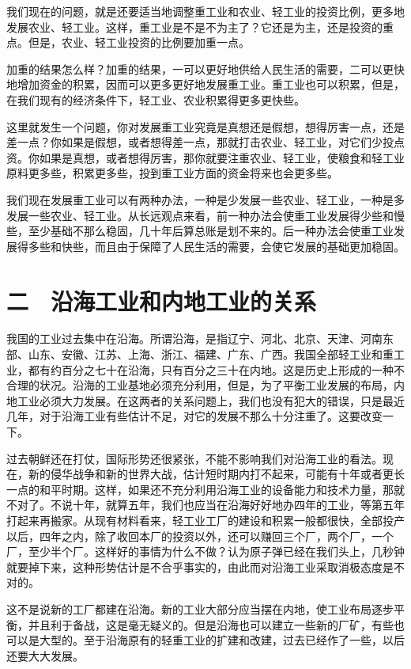 我们现在的问题，就是还要适当地调整重工业和农业、轻工业的投资比例，更多地发展农业、轻工业。这样，重工业是不是不为主了？它还是为主，还是投资的重点。但是，农业、轻工业投资的比例要加重一点。

加重的结果怎么样？加重的结果，一可以更好地供给人民生活的需要，二可以更快地增加资金的积累，因而可以更多更好地发展重工业。重工业也可以积累，但是，在我们现有的经济条件下，轻工业、农业积累得更多更快些。

这里就发生一个问题，你对发展重工业究竟是真想还是假想，想得厉害一点，还是差一点？你如果是假想，或者想得差一点，那就打击农业、轻工业，对它们少投点资。你如果是真想，或者想得厉害，那你就要注重农业、轻工业，使粮食和轻工业原料更多些，积累更多些，投到重工业方面的资金将来也会更多些。

我们现在发展重工业可以有两种办法，一种是少发展一些农业、轻工业，一种是多发展一些农业、轻工业。从长远观点来看，前一种办法会使重工业发展得少些和慢些，至少基础不那么稳固，几十年后算总账是划不来的。后一种办法会使重工业发展得多些和快些，而且由于保障了人民生活的需要，会使它发展的基础更加稳固。

\section{二　沿海工业和内地工业的关系}

我国的工业过去集中在沿海。所谓沿海，是指辽宁、河北、北京、天津、河南东部、山东、安徽、江苏、上海、浙江、福建、广东、广西。我国全部轻工业和重工业，都有约百分之七十在沿海，只有百分之三十在内地。这是历史上形成的一种不合理的状况。沿海的工业基地必须充分利用，但是，为了平衡工业发展的布局，内地工业必须大力发展。在这两者的关系问题上，我们也没有犯大的错误，只是最近几年，对于沿海工业有些估计不足，对它的发展不那么十分注重了。这要改变一下。

过去朝鲜还在打仗，国际形势还很紧张，不能不影响我们对沿海工业的看法。现在，新的侵华战争和新的世界大战，估计短时期内打不起来，可能有十年或者更长一点的和平时期。这样，如果还不充分利用沿海工业的设备能力和技术力量，那就不对了。不说十年，就算五年，我们也应当在沿海好好地办四年的工业，等第五年打起来再搬家。从现有材料看来，轻工业工厂的建设和积累一般都很快，全部投产以后，四年之内，除了收回本厂的投资以外，还可以赚回三个厂，两个厂，一个厂，至少半个厂。这样好的事情为什么不做？认为原子弹已经在我们头上，几秒钟就要掉下来，这种形势估计是不合乎事实的，由此而对沿海工业采取消极态度是不对的。

这不是说新的工厂都建在沿海。新的工业大部分应当摆在内地，使工业布局逐步平衡，并且利于备战，这是毫无疑义的。但是沿海也可以建立一些新的厂矿，有些也可以是大型的。至于沿海原有的轻重工业的扩建和改建，过去已经作了一些，以后还要大大发展。

